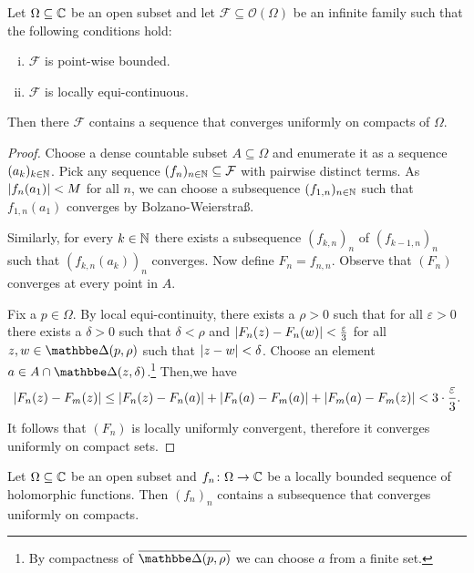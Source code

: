 \begin{izrek}
Let $\Omega \subseteq \mathbb{C}$ be an open subset and let
$\mathcal{F} \subseteq \mathcal{O}(\Omega)$ be an infinite family
such that the following conditions hold:

\begin{enumerate}[i)]
\item $\mathcal{F}$ is point-wise bounded.
\item $\mathcal{F}$ is locally equi-continuous.
\end{enumerate}

Then there $\mathcal{F}$ contains a sequence that converges
uniformly on compacts of $\Omega$.
\end{izrek}

\begin{proof}
Choose a dense countable subset $A \subseteq \Omega$ and enumerate
it as a sequence $(a_k)_{k \in \mathbb{N}}$. Pick any sequence
$(f_n)_{n \in \mathbb{N}} \subseteq \mathcal{F}$ with pairwise distinct
terms. As $\left\lvert f_n(a_1)\right\rvert < M$ for all $n$, we can choose a
subsequence $(f_{1,n})_{n \in \mathbb{N}}$ such that $f_{1,n}(a_1)$
converges by Bolzano-Weierstraß.

Similarly, for every $k \in \mathbb{N}$ there exists a subsequence
$(f_{k,n})_{n}$ of $(f_{k-1,n})_n$ such that $(f_{k,n}(a_k))_n$
converges. Now define $F_n = f_{n,n}$. Observe that $(F_n)$
converges at every point in $A$.

Fix a $p \in \Omega$. By local equi-continuity, there exists a
$\rho > 0$ such that for all $\varepsilon > 0$ there exists a
$\delta > 0$ such that $\delta < \rho$ and
$\left\lvert F_n(z) - F_n(w)\right\rvert < \frac{\varepsilon}{3}$ for all
$z, w \in \dsk(p, \rho)$ such that $\left\lvert z-w\right\rvert < \delta$. Choose an
element $a \in A \cap \dsk(z, \delta)$.\footnote{By compactness of
$\oline{\dsk(p, \rho)}$ we can choose $a$ from a finite set.} Then,we have
\[
\left\lvert F_n(z) - F_m(z)\right\rvert \leq
\left\lvert F_n(z) - F_n(a)\right\rvert +
\left\lvert F_n(a) - F_m(a)\right\rvert +
\left\lvert F_m(a) - F_m(z)\right\rvert <
3 \cdot \frac{\varepsilon}{3}.
\]
It follows that $(F_n)$ is locally uniformly convergent, therefore
it converges uniformly on compact sets.
\end{proof}

\begin{izrek}[Montel]
Let $\Omega \subseteq \mathbb{C}$ be an open subset and
$f_n \colon \Omega \to \mathbb{C}$ be a locally bounded sequence of
holomorphic functions. Then $(f_n)_n$ contains a subsequence that
converges uniformly on compacts.
\end{izrek}

